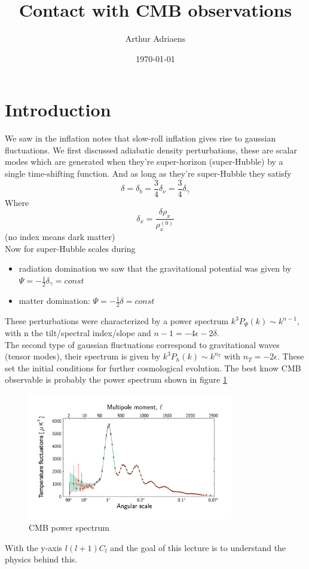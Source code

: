 \documentclass{article}
\title{Contact with CMB observations}
\author{Arthur Adriaens}
\date{\today}
\begin{document}
	\maketitle

  \section{Introduction}
  We saw in the inflation notes that slow-roll inflation gives rise to gaussian fluctuations. We first discussed adiabatic density perturbations, these are scalar modes which are generated when they're super-horizon (super-Hubble) by a single time-shifting function. And as long as they're super-Hubble they satisfy
  \begin{equation}
    \delta = \delta_b = \frac{3}{4}\delta_\nu=\frac{3}{4}\delta_\gamma
  \end{equation}
  Where
  \begin{equation}
    \delta_x = \frac{\delta\rho_x}{\rho_x^{(0)}}
  \end{equation}
  (no index means dark matter)\\
  Now for super-Hubble scales during
\begin{itemize}
  \item radiation domination we saw that the gravitational potential was given by $\Psi = -\frac{1}{2}\delta_\gamma = const$
  \item matter domination: $\Psi = -\frac{1}{2}\delta = const$
\end{itemize}
These perturbations were characterized by a power spectrum $k^3P_\Psi(k) \sim k^{n-1}$, with n the tilt/spectral index/slope and $n-1 = -4\epsilon -2\delta$.\\
The second type of gaussian fluctuations correspond to gravitational waves (tensor modes), their spectrum is given by $k^3P_h(k)\sim k^{n_T}$ with $n_T = -2\epsilon$. These set the initial conditions for further cosmological evolution.
The best know CMB observable is probably the power spectrum shown in figure \ref{power spectrum}
\begin{figure}
  \centering
  \includegraphics[width=0.8\textwidth]{Planck_power_spectrum_orig.jpg}
  \caption{CMB power spectrum}
  \label{power spectrum}
\end{figure}
 With the y-axis $l(l+1)C_l$ and the goal of this lecture is to understand the physics behind this. 
\end{document}
